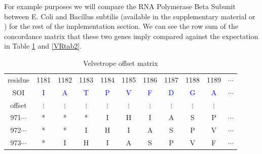 \documentclass[phd,tocprelim]{cornell}
\begin{document}
For example purposes we will compare the RNA Polymerase Beta Subunit between E. Coli and Bacillus subtilis (available in the supplementary material or \cite{GenBank}) for the rest of the implementation section. We can see the row sum of the concordance matrix that these two genes imply compared against the expectation in Table \ref{VRtab1} and \ref{VRtab2}.

\begin{table}[htp]
    \caption{Velvetrope offset matrix}
    \label{VRtab1}
\begin{center}
{\small
\begin{tabular}{|ccccccccccc|}                                                                                                     
\hline                                                                                                                                      
\scriptsize{residue} & \small{1181} &  \small{1182} &  \small{1183} &  \small{1184} &  \small{1185} &  \small{1186} &  \small{1187} &  \small{1188} &  \small{1189} & \small{}$\cdots$ \\                                                                                             
SOI & \textcolor{blue}{I} &  \textcolor{blue}{A} &  \textcolor{blue}{T} &  \textcolor{blue}{P} &  \textcolor{blue}{V} &  \textcolor{blue}{F} &  \textcolor{blue}{D} &  \textcolor{blue}{G} &  \textcolor{blue}{A} & $\cdots$ \\                                                                                                                                                                                
\hline                                                                                                                                                                                                      
\scriptsize{offset} & $\vdots$ &  $\vdots$ &  $\vdots$ & $\vdots$ &  $\vdots$ &  $\vdots$ & $\vdots$ &  $\vdots$ &  $\vdots$ & \\                                                                                                                                                                          
\small{971}$\cdots$ & * & * & * & I & H & I & A & S & P & $\cdots$ \\                                                                                  
\small{972}$\cdots$ & * & * & I & H & I & A & S & P & V & $\cdots$ \\                                                                                  
\small{973}$\cdots$ & * & I & H & I & A & S & P & V & F & $\cdots$ \\                                                                                  

\end{tabular}}
\end{center}
\end{table}
\end{document}

